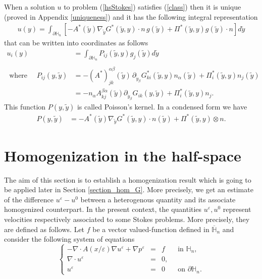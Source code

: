 \documentclass[11pt, reqno]{amsart}
\theoremstyle{definition}
\theoremstyle{remark}
\numberwithin{equation}{section}
\begin{document}
	\noindent	When a solution $u$ to problem (\ref{hsStokes}) satisfies \textup{(\ref{class})} then it is unique (proved in  Appendix \ref{uniqueness}) and it  has the following integral representation
	\begin{align*}
		u(y)= \int_{\partial\mathbb{H}_n} \left[-A^*(\tilde{y}) \nabla_{\tilde{y}} G^*(\tilde{y},y)\cdot n\,g (\tilde{y})+ \Pi^*(\tilde{y},y)g(\tilde{y}) \cdot n\right] d\tilde{y}
	\end{align*}
	that can be written into coordinates as follows
	\begin{align}\label{represintgral}
		u_i(y)&= \int_{\partial\mathbb{H}_n} P_{ij}(\tilde{y},y)g_j(\tilde{y})  d\tilde{y}\\\nonumber\\
		\mbox{ where }\quad 	P_{ij}(y,\tilde{y})
		&=-(A^*)_{jk}^{\alpha\beta}(\tilde{y})\, \partial_{\tilde{y}_\beta}G_{ki}^*(\tilde{y},y) n_\alpha (\tilde{y})+  \Pi_i^*(\tilde{y},y) n_j(\tilde{y})\\
		&=  -n_\alpha A^{\beta\alpha}_{kj}(\tilde{y})\partial_{\tilde{y}_\beta} G_{ik} (y,\tilde{y}) +\Pi^*_i (\tilde{y},y) n_j	\nonumber.
	\end{align}
	This function $	P(y,\tilde{y})$ is called  Poisson's kernel. In a condensed form we have
	\begin{align*}
		P(y,\tilde{y})
		&=-A^*(\tilde{y}) \nabla_{\tilde{y}} G^*(\tilde{y},y)\cdot n (\tilde{y})+ \Pi^*(\tilde{y},y)\otimes n.
	\end{align*}

	
		\section{Homogenization in the half-space}\label{section_hom}
	\noindent The aim of this section is to establish a  homogenization   result  which is going to be applied later in Section \ref{section_hom_G}. More precisely, we get an estimate of the difference $u^\varepsilon -u^0$ between a heterogenous quantity and its associate homogenized counterpart. In the present context, the quantities $u^\varepsilon, u^0$ represent velocities respectively associated to some Stokes problems. More precisely, they are defined as follows.
	Let $f$ be a vector valued-function defined in $\overline{\mathbb{H}}_n$ and consider the following system of equations
	\begin{equation}\label{hpstoks}
		\left\{
		\begin{array}{rcll}
			-\nabla\cdot A (x/\varepsilon)\nabla u^\varepsilon +  \nabla p^\varepsilon&=& f  \quad &\mbox{in } {\mathbb{H}}_n,\\
			\nabla\cdot u^\varepsilon&=& 0 ,&\\
			u^\varepsilon &=& 0\quad  &\mbox{on } \partial{\mathbb{H}}_n.
		\end{array}
		\right. 
	\end{equation}
	
\end{document}
